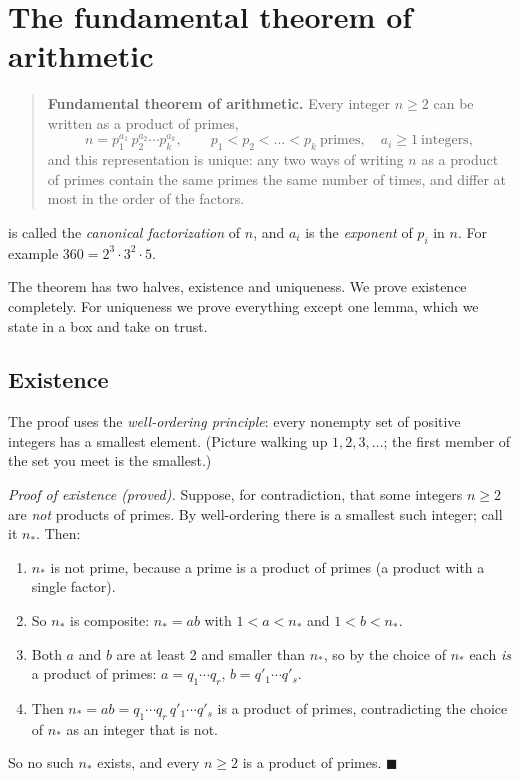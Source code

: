 \section{The fundamental theorem of arithmetic}\label{sec:primes-fta}

\begin{quote}
\textbf{Fundamental theorem of arithmetic.} Every integer $n\ge2$ can be written as a product of primes,
\begin{equation}
n = p_1^{a_1}\,p_2^{a_2}\cdots p_k^{a_k},\qquad p_1<p_2<\dots<p_k\ \text{primes},\quad a_i\ge1\ \text{integers},
\label{eq:primes-fta}
\end{equation}
and this representation is unique: any two ways of writing $n$ as a product of primes contain the same primes the same number of times, and differ at most in the order of the factors.
\end{quote}

 is called the \emph{canonical factorization} of $n$, and $a_i$ is the \emph{exponent} of $p_i$ in $n$. For example $360=2^3\cdot3^2\cdot5$.

The theorem has two halves, existence and uniqueness. We prove existence completely. For uniqueness we prove everything except one lemma, which we state in a box and take on trust.

\subsection{Existence}

The proof uses the \emph{well-ordering principle}: every nonempty set of positive integers has a smallest element. (Picture walking up $1,2,3,\dots$; the first member of the set you meet is the smallest.)

\emph{Proof of existence (proved).} Suppose, for contradiction, that some integers $n\ge2$ are \emph{not} products of primes. By well-ordering there is a smallest such integer; call it $n_*$. Then:
\begin{enumerate}
\item $n_*$ is not prime, because a prime is a product of primes (a product with a single factor).
\item So $n_*$ is composite: $n_*=ab$ with $1<a<n_*$ and $1<b<n_*$.
\item Both $a$ and $b$ are at least 2 and smaller than $n_*$, so by the choice of $n_*$ each \emph{is} a product of primes: $a=q_1\cdots q_r$, $b=q'_1\cdots q'_s$.
\item Then $n_*=ab=q_1\cdots q_r\,q'_1\cdots q'_s$ is a product of primes, contradicting the choice of $n_*$ as an integer that is not.
\end{enumerate}
So no such $n_*$ exists, and every $n\ge2$ is a product of primes. $\blacksquare$


